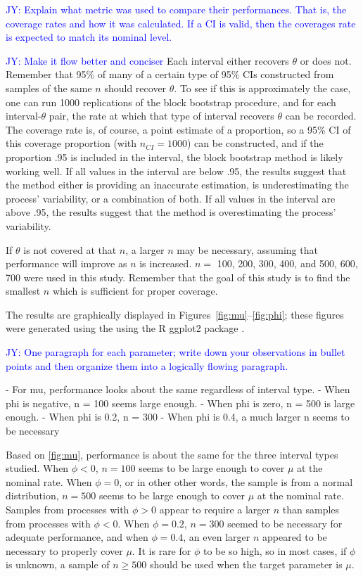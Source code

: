 \documentclass[12pt, letterpaper, titlepage]{article}
\newcommand{\jy}[1]{\textcolor{blue}{JY: #1}}
\begin{document}
\jy{Explain what metric was used to compare their performances. That is, the
  coverage rates and how it was calculated. If a CI is valid, then the coverages
  rate is expected to match its nominal level.}

\jy{Make it flow better and conciser}
Each interval either recovers $\theta$ or does not. Remember that
95\% of many of a certain type of 95\% CIs constructed from
samples of the same $n$ should recover $\theta$. To see if this is
approximately the case, one can run 1000 replications of the block bootstrap
procedure, and for each interval-$\theta$ pair, the rate at which that type of
interval recovers $\theta$ can be recorded. The coverage rate is, of course, a
point estimate of a proportion, so a 95\% CI of this coverage
proportion (with $n_{CI} = 1000$) can be constructed, and if the proportion
.95 is included in the interval, the block bootstrap method is likely working
well. If all values in the interval are below .95, the results suggest that the
method either is providing an inaccurate estimation, is underestimating the
process' variability, or a combination of both. If all values in the interval
are above .95, the results suggest that the method is overestimating the
process' variability.

If $\theta$ is not covered at that $n$, a larger $n$ may be
necessary, assuming that performance will improve as $n$ is increased. $n =$
100, 200, 300, 400, and 500, 600, 700 were used in this study. Remember that
the goal of this study is to find the smallest $n$ which is sufficient for
proper coverage.


The results are graphically displayed in Figures~\ref{fig:mu}--\ref{fig:phi};
these figures were generated using the using
the R ggplot2 package \citep{ggplot2}.



\jy{One paragraph for each parameter; write down your observations in bullet
  points and then organize them into a logically flowing paragraph.}

- For mu, performance looks about the same regardless of interval type.
- When phi is negative, n = 100 seems large enough.
- When phi is zero, n = 500 is large enough.
- When phi is 0.2, n = 300
- When phi is 0.4, a much larger n seems to be necessary

Based on \ref{fig:mu}, performance is
about the same for the three interval types studied. When $\phi < 0$,
$n = 100$ seems to  be large enough to cover $\mu$ at the nominal rate. When
$\phi = 0$, or in other other words, the sample is from a normal distribution,
$n = 500$ seems to be large enough to cover $\mu$ at the nominal rate. Samples
from processes with $\phi > 0$ appear to require a larger $n$ than samples from
processes with $\phi < 0$. When $\phi = 0.2$, $n = 300$ seemed to be necessary
for adequate performance, and when $\phi = 0.4$, an even larger $n$ appeared
to be necessary to properly cover $\mu$. It is rare for $\phi$ to be so high,
so in most cases, if $\phi$ is unknown, a sample of $n \geq 500$ should be
used when the target parameter is $\mu$. 
\end{document}
